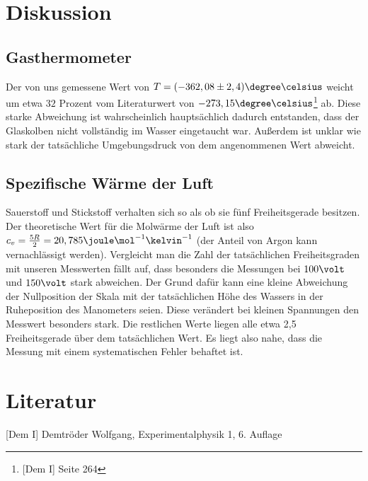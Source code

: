 \documentclass[12pt, a4paper, twoside]{scrartcl}
\begin{document}
\section{Diskussion}
\label{sec:diskussion}

\subsection{Gasthermometer}
Der von uns gemessene Wert von  $T=(-362,08\pm2,4)\degree\celsius$ weicht um etwa $32$ Prozent vom Literaturwert von $-273,15\degree\celsius$\footnote{[Dem I] Seite 264} ab. Diese starke Abweichung ist wahrscheinlich hauptsächlich dadurch entstanden, dass der Glaskolben nicht vollständig im Wasser eingetaucht war. Außerdem ist unklar wie stark der tatsächliche Umgebungsdruck von dem angenommenen Wert abweicht.

\subsection{Spezifische Wärme der Luft}

Sauerstoff und Stickstoff verhalten sich so als ob sie fünf Freiheitsgerade besitzen. Der theoretische Wert für die Molwärme der Luft ist also $c_v=\frac{5R}{2}=20,785 \joule \mol^{-1} \kelvin^{-1}$ (der Anteil von Argon kann vernachlässigt werden). Vergleicht man die Zahl der tatsächlichen Freiheitsgraden mit unseren Messwerten fällt auf, dass besonders die Messungen bei $100 \volt$ und $150 \volt$ stark abweichen. Der Grund dafür kann eine kleine Abweichung der Nullposition der Skala mit der tatsächlichen Höhe des Wassers in der Ruheposition des Manometers seien. Diese verändert bei kleinen Spannungen den Messwert besonders stark. Die restlichen Werte liegen alle etwa 2,5 Freiheitsgerade über dem  tatsächlichen Wert. Es liegt also nahe, dass die Messung mit einem systematischen Fehler behaftet ist.





\section*{Literatur}

[Dem I] Demtröder Wolfgang, Experimentalphysik 1, 6. Auflage
\end{document}
